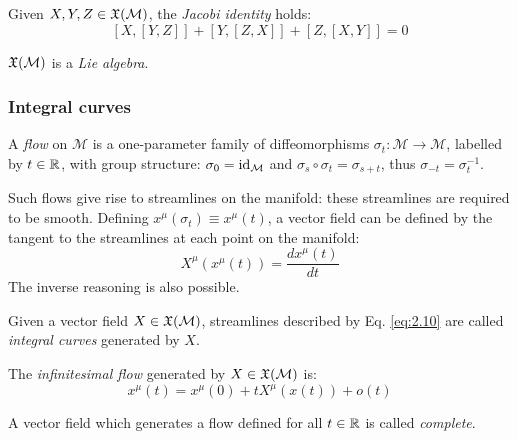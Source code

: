 \begin{theorem}[Jacobi]
  Given $ X,Y,Z \in\mathfrak{X}(\mathcal{M}) $, the \textit{Jacobi identity} holds:
  \begin{equation}
    \left[ X, \left[ Y,Z \right] \right] + \left[ Y, \left[ Z,X \right] \right] + \left[ Z, \left[ X,Y \right] \right] = 0
    \label{eq:2.9}
  \end{equation}
\end{theorem}

\begin{proposition}
  $ \mathfrak{X}(\mathcal{M}) $ is a \textit{Lie algebra}.
\end{proposition}

\subsubsection{Integral curves}

\begin{definition}
  A \textit{flow} on $ \mathcal{M} $ is a one-parameter family of diffeomorphisms $ \sigma_t : \mathcal{M} \rightarrow \mathcal{M} $, labelled by $ t\in\mathbb{R} $, with group structure: $ \sigma_0 = \operatorname{id}_{\mathcal{M}} $ and $ \sigma_s \circ \sigma_t = \sigma_{s+t} $, thus $ \sigma_{-t} = \sigma_t^{-1} $.
\end{definition}

Such flows give rise to streamlines on the manifold: these streamlines are required to be smooth.
Defining $ x^{\mu}(\sigma_t) \equiv x^{\mu}(t) $, a vector field can be defined by the tangent to the streamlines at each point on the manifold:
\begin{equation}
  X^{\mu}(x^{\mu}(t)) = \frac{dx^{\mu}(t)}{dt}
  \label{eq:2.10}
\end{equation}
The inverse reasoning is also possible.

\begin{definition}
  Given a vector field $ X \in\mathfrak{X}(\mathcal{M}) $, streamlines described by Eq. \ref{eq:2.10} are called \textit{integral curves} generated by $ X $.
\end{definition}

\begin{proposition}
  The \textit{infinitesimal flow} generated by $ X \in\mathfrak{X}(\mathcal{M}) $ is:
  \begin{equation}
    x^{\mu}(t) = x^{\mu}(0) + tX^{\mu}(x(t)) + o(t)
    \label{eq:2.11}
  \end{equation}
\end{proposition}

\begin{definition}
  A vector field which generates a flow defined for all $ t \in \mathbb{R} $ is called \textit{complete}.
\end{definition}

